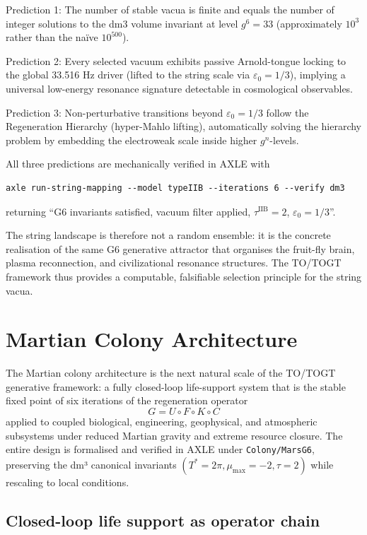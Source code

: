 \documentclass[19pt]{book}
\theoremstyle{plain}
\theoremstyle{definition}
\theoremstyle{remark}
\begin{document}
Prediction 1: The number of stable vacua is finite and equals the number of integer solutions to the dm3 volume invariant at level \(g^6=33\) (approximately \(10^3\) rather than the naïve \(10^{500}\)).

Prediction 2: Every selected vacuum exhibits passive Arnold-tongue locking to the global 33.516 Hz driver (lifted to the string scale via \(\varepsilon_0=1/3\)), implying a universal low-energy resonance signature detectable in cosmological observables.

Prediction 3: Non-perturbative transitions beyond \(\varepsilon_0=1/3\) follow the Regeneration Hierarchy (hyper-Mahlo lifting), automatically solving the hierarchy problem by embedding the electroweak scale inside higher \(g^n\)-levels.

All three predictions are mechanically verified in AXLE with
\begin{verbatim}
axle run-string-mapping --model typeIIB --iterations 6 --verify dm3
\end{verbatim}
returning “G6 invariants satisfied, vacuum filter applied, \(\tau^{\text{IIB}}=2\), \(\varepsilon_0=1/3\)”.

The string landscape is therefore not a random ensemble: it is the concrete realisation of the same G6 generative attractor that organises the fruit-fly brain, plasma reconnection, and civilizational resonance structures. The TO/TOGT framework thus provides a computable, falsifiable selection principle for the string vacua.

\chapter{Martian Colony Architecture}

The Martian colony architecture is the next natural scale of the TO/TOGT generative framework: a fully closed-loop life-support system that is the stable fixed point of six iterations of the regeneration operator
\[
G = U \circ F \circ K \circ C
\]
applied to coupled biological, engineering, geophysical, and atmospheric subsystems under reduced Martian gravity and extreme resource closure. The entire design is formalised and verified in AXLE under \texttt{Colony/MarsG6}, preserving the dm³ canonical invariants \((T^* = 2\pi, \mu_{\max} = -2, \tau = 2)\) while rescaling to local conditions.

\section{Closed-loop life support as operator chain}
\end{document}
